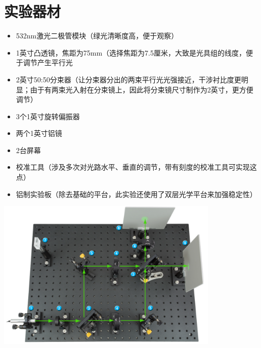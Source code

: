 \documentclass[10pt]{ctexart}
\begin{document}
\section{实验器材}
\begin{itemize}
    \item 532nm激光二极管模块（绿光清晰度高，便于观察）
    \item 1英寸凸透镜，焦距为75mm（选择焦距为7.5厘米，大致是光具组的线度，便于调节产生平行光
    \item 2英寸50:50分束器（让分束器分出的两束平行光光强接近，干涉衬比度更明显；由于有两束光入射在分束镜上，因此将分束镜尺寸制作为2英寸，更方便调节）
    \item 3个1英寸旋转偏振器
    \item 两个1英寸铝镜
    \item 2台屏幕
    \item 校准工具（涉及多次对光路水平、垂直的调节，带有刻度的校准工具可实现这点）
    \item 铝制实验板（除去基础的平台，此实验还使用了双层光学平台来加强稳定性）
\end{itemize}
\begin{minipage}{\textwidth} 
    \includegraphics[width=0.8\textwidth]{干涉仪光路图.png}
\end{minipage}
\end{document}
